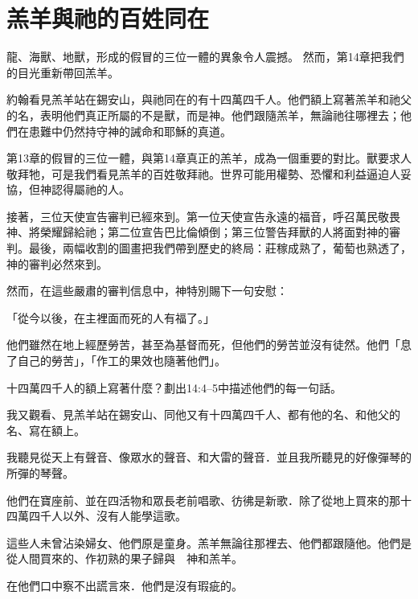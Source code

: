 \section{羔羊與祂的百姓同在}

龍、海獸、地獸，形成的假冒的三位一體的異象令人震撼。
然而，第14章把我們的目光重新帶回羔羊。

約翰看見羔羊站在錫安山，與祂同在的有十四萬四千人。他們額上寫著羔羊和祂父的名，表明他們真正所屬的不是獸，而是神。他們跟隨羔羊，無論祂往哪裡去；他們在患難中仍然持守神的誡命和耶穌的真道。

第13章的假冒的三位一體，與第14章真正的羔羊，成為一個重要的對比。獸要求人敬拜牠，可是我們看見羔羊的百姓敬拜祂。世界可能用權勢、恐懼和利益逼迫人妥協，但神認得屬祂的人。

接著，三位天使宣告審判已經來到。第一位天使宣告永遠的福音，呼召萬民敬畏神、將榮耀歸給祂；第二位宣告巴比倫傾倒；第三位警告拜獸的人將面對神的審判。最後，兩幅收割的圖畫把我們帶到歷史的終局：莊稼成熟了，葡萄也熟透了，神的審判必然來到。

然而，在這些嚴肅的審判信息中，神特別賜下一句安慰：

「從今以後，在主裡面而死的人有福了。」

他們雖然在地上經歷勞苦，甚至為基督而死，但他們的勞苦並沒有徒然。他們「息了自己的勞苦」，「作工的果效也隨著他們」。


\begin{ScriptureBox2}{十四萬四千人的額上寫著什麼？劃出14:4–5中描述他們的每一句話。}
\item[14:1] 我又觀看、見羔羊站在錫安山、同他又有十四萬四千人、都有他的名、和他父的名、寫在額上。

\item[14:2] 我聽見從天上有聲音、像眾水的聲音、和大雷的聲音．並且我所聽見的好像彈琴的所彈的琴聲。

\item[14:3] 他們在寶座前、並在四活物和眾長老前唱歌、彷彿是新歌．除了從地上買來的那十四萬四千人以外、沒有人能學這歌。

\item[14:4] 這些人未曾沾染婦女、他們原是童身。羔羊無論往那裡去、他們都跟隨他。他們是從人間買來的、作初熟的果子歸與　神和羔羊。

\item[14:5] 在他們口中察不出謊言來．他們是沒有瑕疵的。

\end{ScriptureBox2}




